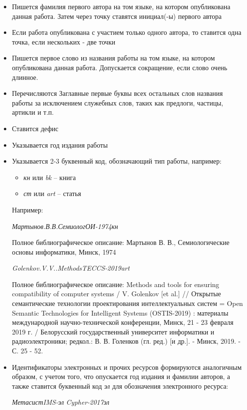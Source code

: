\begin{itemize}
	\item Пишется фамилия первого автора на том языке, на котором опубликована данная работа. Затем через точку ставятся инициал(-ы) первого автора
	\item Если работа опубликована с участием только одного автора, то ставится одна точка, если нескольких - две точки
	\item Пишется первое слово из названия работы на том языке, на котором опубликована данная работа. Допускается сокращение, если слово очень длинное.
	\item Перечисляются Заглавные первые буквы всех остальных слов названия работы за исключением служебных слов, таких как предлоги, частицы, артикли и т.п.
	\item Ставится дефис
	\item Указывается год издания работы
	\item Указывается 2-3 буквенный код, обозначающий тип работы, например:
	\begin{itemize}
		\item \textit{кн} или \textit{bk} -- книга
		\item \textit{ст} или \textit{art} -- статья
	\end{itemize}
	
	Например:
	
	\textit{Мартынов.В.В.СемиологОИ-1974кн}

	Полное библиографическое описание:
	Мартынов В. В., Семиологические основы информатики, Минск, 1974
	
	\textit{Golenkov.V.V..MethodsTECCS-2019art}
	
	Полное библиографическое описание:
	Methods and tools for ensuring compatibility of computer systems / V. Golenkov [et al.] // Открытые семантические технологии проектирования интеллектуальных систем = Open Semantic Technologies for Intelligent Systems (OSTIS-2019) : материалы международной научно-технической конференции, Минск, 21 - 23 февраля 2019 г. / Белорусский государственный университет информатики и радиоэлектроники; редкол.: В. В. Голенков (гл. ред.) [и др.]. - Минск, 2019. - С. 25 - 52.
	
	\item Идентификаторы электронных и прочих ресурсов формируются аналогичным образом, с учетом того, что опускается год издания и фамилии авторов, а также ставится буквенный код \textit{эл} для обозначения электронного ресурса:
	
	\textit{МетасистIMS-эл} 
	\textit{Cypher-2017эл} 
	
\end{itemize}

